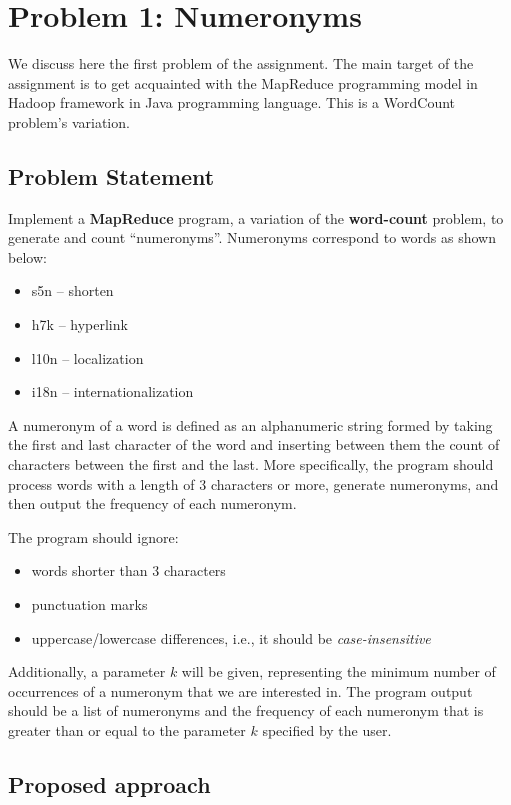 \documentclass[acmlarge]{acmart}
\begin{document}
\section{Problem 1: Numeronyms}
\label{sec:problem1}
We discuss here the first problem of the assignment.
The main target of the assignment is to get acquainted with the MapReduce programming model in Hadoop framework in
Java programming language.
This is a WordCount problem's variation.

\subsection{Problem Statement}
Implement a \textbf{MapReduce} program, a variation of the \textbf{word-count} problem, to generate and count
``numeronyms''. Numeronyms correspond to words as shown below:

\begin{itemize}
  \item s5n – shorten
  \item h7k – hyperlink
  \item l10n – localization
  \item i18n – internationalization
\end{itemize}

A numeronym of a word is defined as an alphanumeric string formed by taking the first and last character of the word and
inserting between them the count of characters between the first and the last.
More specifically, the program should process words with a length of 3 characters or more, generate numeronyms, and then
output the frequency of each numeronym.

The program should ignore:
\begin{itemize}
  \item words shorter than 3 characters
  \item punctuation marks
  \item uppercase/lowercase differences, i.e., it should be \textit{case-insensitive}
\end{itemize}

Additionally, a parameter $k$ will be given, representing the minimum number of occurrences of a numeronym that we are
interested in.
The program output should be a list of numeronyms and the frequency of each numeronym that is greater than or equal to
the parameter $k$ specified by the user.

\subsection{Proposed approach}
\end{document}
